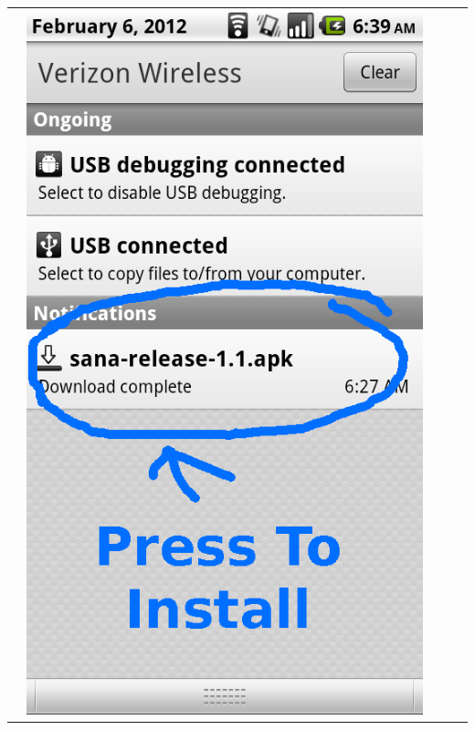 \documentclass[a4paper,10pt]{article}
\begin{document}
\begin{flushleft}
\begin{tabular}{ c c c c c }
&\includegraphics[scale=0.15,keepaspectratio=true]{client_download_notification_expanded.png}

\end{tabular}
\end{flushleft}
\end{document}
